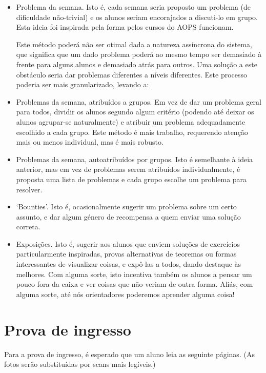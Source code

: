 \documentclass{article}
\begin{document}
	\begin{itemize}
	\item Problema da semana. Isto é, cada semana seria proposto um problema (de dificuldade não-trivial) e os alunos seriam encorajados a discuti-lo em grupo. Esta ideia foi inspirada pela forma pelos cursos do AOPS funcionam.

	Este método poderá não ser otimal dada a natureza assíncrona do sistema, que significa que um dado problema poderá ao mesmo tempo ser demasiado à frente para alguns alunos e demasiado atrás para outros. Uma solução a este obstáculo seria dar problemas diferentes a níveis diferentes. Este processo poderia ser mais granularizado, levando a:

	\item Problemas da semana, atribuídos a grupos. Em vez de dar um problema geral para todos, dividir os alunos segundo algum critério (podendo até deixar os alunos agrupar-se naturalmente) e atribuir um problema adequadamente escolhido a cada grupo. Este método é mais trabalho, requerendo atenção mais ou menos individual, mas é mais robusto.

	\item Problemas da semana, autoatribuídos por grupos. Isto é semelhante à ideia anterior, mas em vez de problemas serem atribuídos individualmente, é proposta uma lista de problemas e cada grupo escolhe um problema para resolver.

	\item `Bounties'. Isto é, ocasionalmente sugerir um problema sobre um certo assunto, e dar algum género de recompensa a quem enviar uma solução correta.

	\item Exposições. Isto é, sugerir aos alunos que enviem soluções de exercícios particularmente inspiradas, provas alternativas de teoremas ou formas interessantes de visualizar coisas, e expô-las a todos, dando destaque às melhores. Com alguma sorte, isto incentiva também os alunos a pensar um pouco fora da caixa e ver coisas que não veriam de outra forma. Aliás, com alguma sorte, até nós orientadores poderemos aprender alguma coisa!
	\end{itemize}
	
	\section{Prova de ingresso}
	
	Para a prova de ingresso, é esperado que um aluno leia as seguinte páginas. (As fotos serão substituídas por scans mais legíveis.)
	
\end{document}
